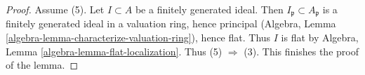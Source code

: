 \begin{proof}
\medskip\noindent
Assume (5). Let $I \subset A$ be a finitely generated ideal.
Then $I_\mathfrak p \subset A_\mathfrak p$ is a finitely generated ideal
in a valuation ring, hence principal
(Algebra, Lemma \ref{algebra-lemma-characterize-valuation-ring}), hence flat.
Thus $I$ is flat by
Algebra, Lemma \ref{algebra-lemma-flat-localization}.
Thus (5) $\Rightarrow$ (3). This finishes the proof of the lemma.
\end{proof}